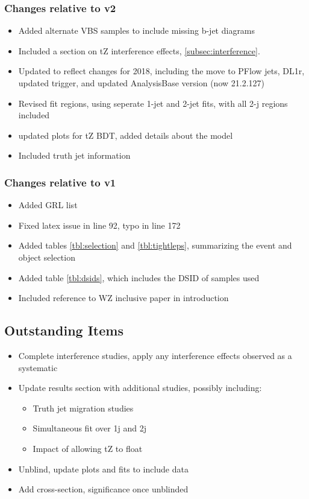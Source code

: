 \documentclass[NOTE, atlasdraft=true, texlive=2016, UKenglish]{\ATLASLATEXPATH atlasdoc}
\begin{document}
\subsubsection{Changes relative to v2}

\begin{itemize}
    \item Added alternate VBS samples to include missing b-jet diagrams
    \item Included a section on tZ interference effects, \ref{subsec:interference}. 
    \item Updated to reflect changes for 2018, including the move to PFlow jets, DL1r, updated trigger, and updated AnalysisBase version (now 21.2.127)
    \item Revised fit regions, using seperate 1-jet and 2-jet fits, with all 2-j regions included
    \item updated plots for tZ BDT, added details about the model
    \item Included truth jet information
\end{itemize}

\subsubsection{Changes relative to v1}

\begin{itemize}
    \item Added GRL list
    \item Fixed latex issue in line 92, typo in line 172
    \item Added tables \ref{tbl:selection} and \ref{tbl:tightleps}, summarizing the event and object selection
    \item Added table \ref{tbl:dsids}, which includes the DSID of samples used
    \item Included reference to WZ inclusive paper in introduction
\end{itemize}

\subsection{Outstanding Items}

\begin{itemize}
    \item Complete interference studies, apply any interference effects observed as a systematic
    \item Update results section with additional studies, possibly including:
    \begin{itemize}
      \item Truth jet migration studies
      \item Simultaneous fit over 1j and 2j
      \item Impact of allowing tZ to float
    \end{itemize}
    \item Unblind, update plots and fits to include data
    \item Add cross-section, significance once unblinded
\end{itemize}
\end{document}
